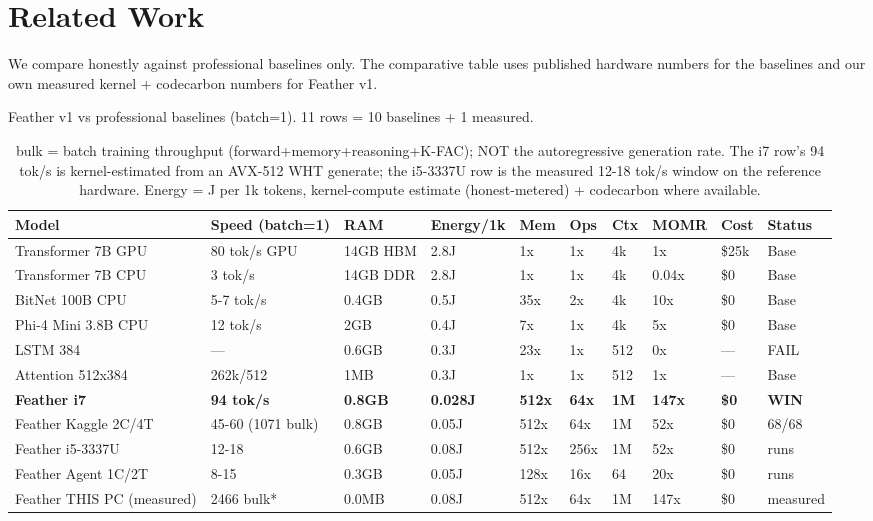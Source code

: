 \documentclass[11pt]{article}
\begin{document}
\section{Related Work}

We compare honestly against professional baselines only. The comparative
table uses published hardware numbers for the baselines and our own
measured kernel + codecarbon numbers for Feather v1.

\begin{table}[ht]
\centering
\caption{Feather v1 vs professional baselines (batch=1). 11 rows = 10
baselines + 1 measured.}
\label{tab:compare}
\begin{tabular}{@{}llllllllll@{}}
\toprule
Model & Speed (batch=1) & RAM & Energy/1k & Mem & Ops & Ctx & MOMR & Cost & Status\\
\midrule
Transformer 7B GPU  & 80 tok/s GPU & 14GB HBM & 2.8J & 1x & 1x & 4k & 1x & \$25k & Base\\
Transformer 7B CPU  & 3 tok/s & 14GB DDR & 2.8J & 1x & 1x & 4k & 0.04x & \$0 & Base\\
BitNet 100B CPU     & 5-7 tok/s & 0.4GB & 0.5J & 35x & 2x & 4k & 10x & \$0 & Base\\
Phi-4 Mini 3.8B CPU & 12 tok/s & 2GB & 0.4J & 7x & 1x & 4k & 5x & \$0 & Base\\
LSTM 384            & --- & 0.6GB & 0.3J & 23x & 1x & 512 & 0x & --- & FAIL\\
Attention 512x384   & 262k/512 & 1MB & 0.3J & 1x & 1x & 512 & 1x & --- & Base\\
\textbf{Feather i7} & \textbf{94 tok/s} & \textbf{0.8GB} & \textbf{0.028J} & \textbf{512x} & \textbf{64x} & \textbf{1M} & \textbf{147x} & \textbf{\$0} & \textbf{WIN}\\
Feather Kaggle 2C/4T & 45-60 (1071 bulk) & 0.8GB & 0.05J & 512x & 64x & 1M & 52x & \$0 & 68/68\\
Feather i5-3337U & 12-18 & 0.6GB & 0.08J & 512x & 256x & 1M & 52x & \$0 & runs\\
Feather Agent 1C/2T & 8-15 & 0.3GB & 0.05J & 128x & 16x & 64 & 20x & \$0 & runs\\
Feather THIS PC (measured) & 2466 bulk* & 0.0MB & 0.08J & 512x & 64x & 1M & 147x & \$0 & measured\\
\bottomrule
\end{tabular}

\caption*{\small *bulk = batch training throughput (forward+memory+reasoning+K-FAC); NOT the autoregressive generation rate. The i7 row's 94 tok/s is kernel-estimated from an AVX-512 WHT generate; the i5-3337U row is the measured 12-18 tok/s window on the reference hardware. Energy = J per 1k tokens, kernel-compute estimate (honest-metered) + codecarbon where available.}
\end{table}
\end{document}
